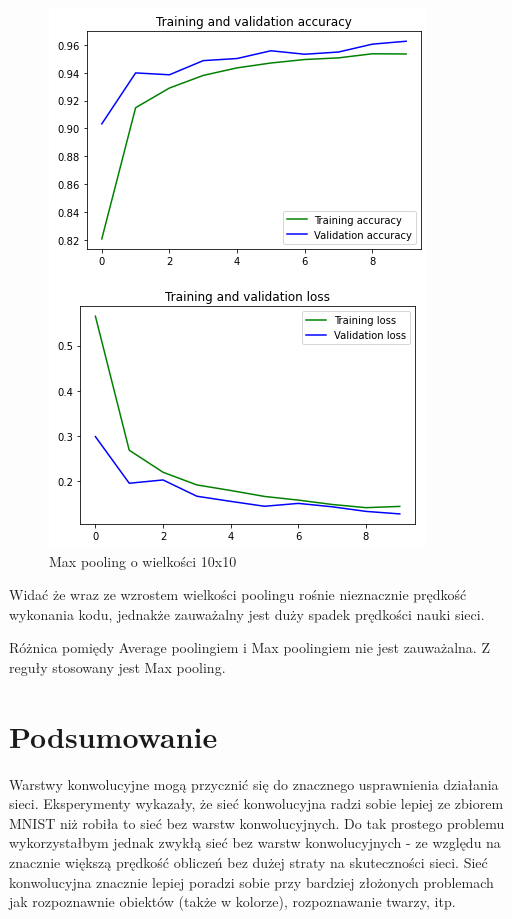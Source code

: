 \documentclass{article}
\begin{document}
\begin{figure}[!htb]
  \centering
  \includegraphics[width=\linewidth]{pooling_max_10_10.png}
  \caption{Max pooling o wielkości 10x10}
\end{figure}

Widać że wraz ze wzrostem wielkości poolingu rośnie nieznacznie prędkość wykonania kodu, jednakże zauważalny jest duży spadek
prędkości nauki sieci.

Różnica pomiędy Average poolingiem i Max poolingiem nie jest zauważalna. Z reguły stosowany jest Max pooling.

\section{Podsumowanie}

Warstwy konwolucyjne mogą przycznić się do znacznego usprawnienia działania sieci. Eksperymenty wykazały, że sieć konwolucyjna
radzi sobie lepiej ze zbiorem MNIST niż robiła to sieć bez warstw konwolucyjnych. Do tak prostego problemu wykorzystałbym jednak
zwykłą sieć bez warstw konwolucyjnych - ze względu na znacznie większą prędkość obliczeń bez dużej straty na skuteczności sieci.
Sieć konwolucyjna znacznie lepiej poradzi sobie przy bardziej złożonych problemach jak rozpoznawnie obiektów (także w kolorze), rozpoznawanie
twarzy, itp.
\end{document}
